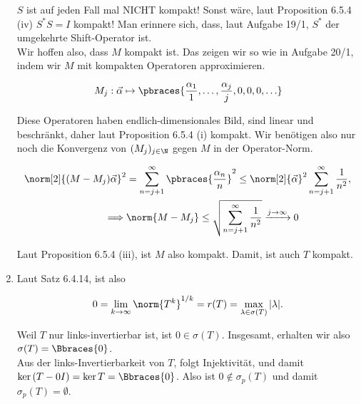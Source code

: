 \begin{solution}
\begin{enumerate}[label = (\alph*)]

  $S$ ist auf jeden Fall mal NICHT kompakt!
  Sonst wäre, laut Proposition 6.5.4 (iv) $S^\ast S = I$ kompakt!
  Man erinnere sich, dass, laut Aufgabe 19/1, $S^\ast$ der umgekehrte Shift-Operator ist. \\

  Wir hoffen also, dass $M$ kompakt ist.
  Das zeigen wir so wie in Aufgabe 20/1, indem wir
  $M$ mit kompakten Operatoren approximieren.

  \begin{align*}
    M_j:
    \vec \alpha
    \mapsto
    \pbraces
    {
      \frac{\alpha_1}{1},
      \ldots,
      \frac{\alpha_j}{j},
      0, 0, 0, \ldots
    }
  \end{align*}

  Diese Operatoren haben endlich-dimensionales Bild, sind linear und beschränkt, daher
  laut Proposition 6.5.4 (i) kompakt.
  Wir benötigen also nur noch die Konvergenz von $(M_j)_{j \in \N}$ gegen $M$ in der Operator-Norm.

  \begin{align*}
    \norm[2]{(M - M_j) \vec \alpha}^2
    & =
    \sum_{n = j+1}^\infty
    \pbraces
    {
      \frac{\alpha_n}{n}
    }^2
    \leq
    \norm[2]{\vec \alpha}^2
    \sum_{n = j+1}^\infty
    \frac{1}{n^2}, \\
    \implies &
    \norm{M - M_j}
    \leq
    \sqrt
    {
      \sum_{n = j+1}^\infty
      \frac{1}{n^2}
    }
    \xrightarrow{j \to \infty} 0
  \end{align*}

  Laut Proposition 6.5.4 (iii), ist $M$ also kompakt.
  Damit, ist auch $T$ kompakt.

  \item
  \phantom{}


  Laut Satz 6.4.14, ist also

  \begin{align*}
    0
    =
    \lim_{k \to \infty} \norm{T^k}^{1/k}
    =
    r(T)
    =
    \max_{\lambda \in \sigma(T)} |\lambda|.
  \end{align*}

  Weil $T$ nur links-invertierbar ist, ist $0 \in \sigma(T)$.
  Insgesamt, erhalten wir also $\sigma(T) = \Bbraces{0}$. \\

  Aus der links-Invertierbarkeit von $T$, folgt Injektivität, und damit $\ker{(T - 0 I)} = \ker{T} = \Bbraces{0}$.
  Also ist $0 \notin \sigma_p(T)$ und damit $\sigma_p(T) = \emptyset$.

\end{enumerate}

\end{solution}
